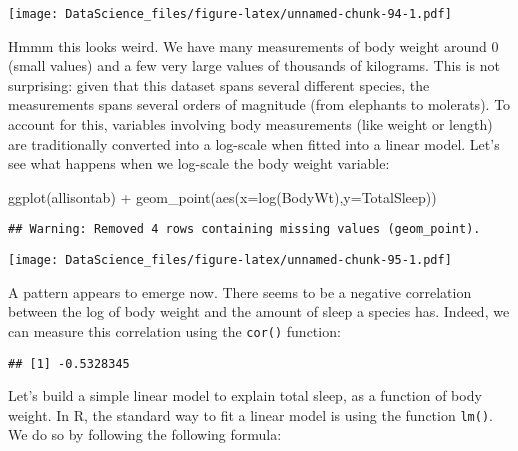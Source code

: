\documentclass[
]{book}
\newenvironment{Shaded}{\begin{snugshade}}{\end{snugshade}}
\newcommand{\AttributeTok}[1]{\textcolor[rgb]{0.77,0.63,0.00}{#1}}
\newcommand{\FunctionTok}[1]{\textcolor[rgb]{0.00,0.00,0.00}{#1}}
\newcommand{\NormalTok}[1]{#1}
\newcommand{\SpecialCharTok}[1]{\textcolor[rgb]{0.00,0.00,0.00}{#1}}
\newcommand{\StringTok}[1]{\textcolor[rgb]{0.31,0.60,0.02}{#1}}
\begin{document}
\texttt{[image: DataScience\_files/figure-latex/unnamed-chunk-94-1.pdf]}

Hmmm this looks weird. We have many measurements of body weight around 0 (small values) and a few very large values of thousands of kilograms. This is not surprising: given that this dataset spans several different species, the measurements spans several orders of magnitude (from elephants to molerats). To account for this, variables involving body measurements (like weight or length) are traditionally converted into a log-scale when fitted into a linear model. Let's see what happens when we log-scale the body weight variable:

\begin{Shaded}
\begin{Highlighting}[]
\FunctionTok{ggplot}\NormalTok{(allisontab) }\SpecialCharTok{+} \FunctionTok{geom\_point}\NormalTok{(}\FunctionTok{aes}\NormalTok{(}\AttributeTok{x=}\FunctionTok{log}\NormalTok{(BodyWt),}\AttributeTok{y=}\NormalTok{TotalSleep))}
\end{Highlighting}
\end{Shaded}

\begin{verbatim}
## Warning: Removed 4 rows containing missing values (geom_point).
\end{verbatim}

\texttt{[image: DataScience\_files/figure-latex/unnamed-chunk-95-1.pdf]}

A pattern appears to emerge now. There seems to be a negative correlation between the log of body weight and the amount of sleep a species has. Indeed, we can measure this correlation using the \texttt{cor()} function:

\begin{Shaded}
\end{Shaded}

\begin{verbatim}
## [1] -0.5328345
\end{verbatim}

Let's build a simple linear model to explain total sleep, as a function of body weight. In R, the standard way to fit a linear model is using the function \texttt{lm()}. We do so by following the following formula:
\end{document}
